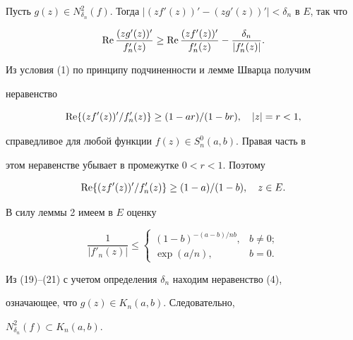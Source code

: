  


\begin{pf} 


Пусть $g(z)\in N^2_{\delta_n}(f)$. Тогда $|(z f'(z))'-(z 


g'(z))'|<\delta_n$ в $E$, так что 


\begin{equation} 


\re\frac{(z g'(z))'}{f'_n(z)}\ge \re 


\frac{(z f'(z))'}{f'_n(z)}-\frac{\delta_n}{|f'_n(z)|}. 


\end{equation} 


 


Из условия (1) по принципу подчиненности и лемме Шварца получим 


неравенство 


$$ 


\re\{(z f'(z))'/f'_n(z)\}\ge (1-ar)/(1-br),\quad |z|=r<1, 


$$ 


справедливое для любой функции $f(z)\in S^0_n(a,b)$. Правая часть в 


этом неравенстве убывает в промежутке $0<r<1$. Поэтому 


\begin{equation} 


\re\{(z f'(z))'/f'_n(z)\}\ge (1-a)/(1-b),\quad z\in E. 


\end{equation} 


 


В силу леммы 2 имеем в $E$ оценку 


\begin{equation} 


\frac{1}{|f'_n(z)|}\le 


\begin{cases} 


(1-b)^{-(a-b)/nb}, & b\ne 0;\\ 


\exp(a/n), & b=0. 


\end{cases} 


\end{equation} 


Из (19)--(21) с учетом определения $\delta_n$ находим неравенство (4), 


означающее, что $g(z)\in K_n(a,b)$. Следовательно, 


$N^2_{\delta_n}(f)\subset K_n(a,b)$. 


\end{pf} 


